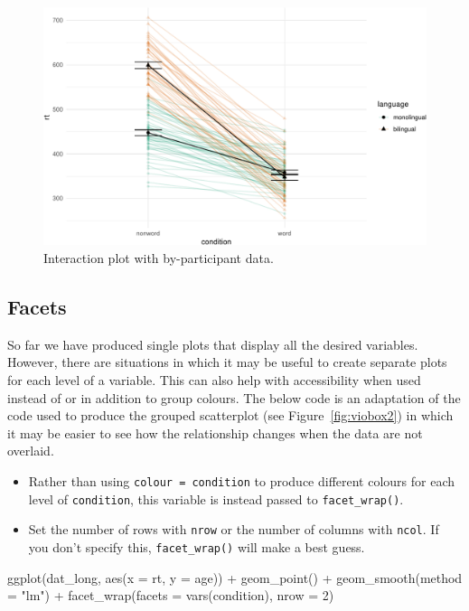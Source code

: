 \documentclass[
  english,
  doc,floatsintext]{apa6}
\newenvironment{Shaded}{\begin{snugshade}}{\end{snugshade}}
\newcommand{\AttributeTok}[1]{\textcolor[rgb]{0.77,0.63,0.00}{#1}}
\newcommand{\DecValTok}[1]{\textcolor[rgb]{0.00,0.00,0.81}{#1}}
\newcommand{\FunctionTok}[1]{\textcolor[rgb]{0.00,0.00,0.00}{#1}}
\newcommand{\NormalTok}[1]{#1}
\newcommand{\SpecialCharTok}[1]{\textcolor[rgb]{0.00,0.00,0.00}{#1}}
\newcommand{\StringTok}[1]{\textcolor[rgb]{0.31,0.60,0.02}{#1}}
\providecommand{\tightlist}{%
  \setlength{\itemsep}{0pt}\setlength{\parskip}{0pt}}
\begin{document}
\begin{figure}

{\centering \includegraphics[width=1\linewidth]{images/ixn-by-subj-1} 

}

\caption{Interaction plot with by-participant data.}\label{fig:ixn-by-subj}
\end{figure}

\hypertarget{facets}{%
\subsection{Facets}\label{facets}}

So far we have produced single plots that display all the desired variables. However, there are situations in which it may be useful to create separate plots for each level of a variable. This can also help with accessibility when used instead of or in addition to group colours. The below code is an adaptation of the code used to produce the grouped scatterplot (see Figure~\ref{fig:viobox2}) in which it may be easier to see how the relationship changes when the data are not overlaid.

\begin{itemize}
\tightlist
\item
  Rather than using \texttt{colour\ =\ condition} to produce different colours for each level of \texttt{condition}, this variable is instead passed to \texttt{facet\_wrap()}.
\item
  Set the number of rows with \texttt{nrow} or the number of columns with \texttt{ncol}. If you don't specify this, \texttt{facet\_wrap()} will make a best guess.
\end{itemize}

\begin{Shaded}
\begin{Highlighting}[]
\FunctionTok{ggplot}\NormalTok{(dat\_long, }\FunctionTok{aes}\NormalTok{(}\AttributeTok{x =}\NormalTok{ rt, }\AttributeTok{y =}\NormalTok{ age)) }\SpecialCharTok{+}
  \FunctionTok{geom\_point}\NormalTok{() }\SpecialCharTok{+}
  \FunctionTok{geom\_smooth}\NormalTok{(}\AttributeTok{method =} \StringTok{"lm"}\NormalTok{) }\SpecialCharTok{+}
  \FunctionTok{facet\_wrap}\NormalTok{(}\AttributeTok{facets =} \FunctionTok{vars}\NormalTok{(condition), }\AttributeTok{nrow =} \DecValTok{2}\NormalTok{)}
\end{Highlighting}
\end{Shaded}
\end{document}
